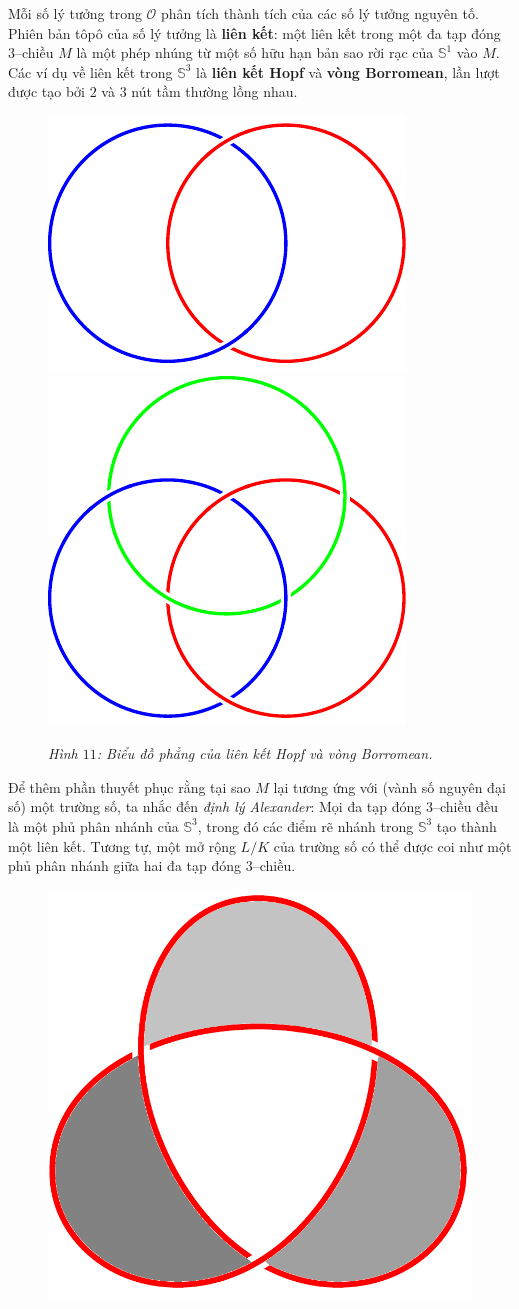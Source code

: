 \begin{multicols}{2}
	\vskip 0.1cm
	Mỗi số lý tưởng trong $\mathcal{O}$ phân tích thành tích của các số lý tưởng nguyên tố. Phiên bản tôpô của số lý tưởng là {\bf\color{duongvaotoanhoc} liên kết}: một liên kết trong một đa tạp đóng $3$--chiều $M$ là một phép nhúng từ một số hữu hạn bản sao rời rạc của $\mathbb{S}^1$ vào $M$. Các ví dụ về liên kết trong $\mathbb{S}^3$ là {\bf\color{duongvaotoanhoc} liên kết Hopf} và {\bf\color{duongvaotoanhoc} vòng Borromean}, lần lượt được tạo bởi $2$ và $3$ nút tầm thường lồng nhau.
	\begin{figure}[H]
		\vspace*{-15pt}
		\centering
		\captionsetup{labelformat= empty, justification=centering}
		\includegraphics[width= 0.42\linewidth]{hopf.pdf}\quad\quad
		\includegraphics[width= 0.42\linewidth]{borromean.pdf}
		\caption{\small\textit{\color{duongvaotoanhoc}Hình $11$: Biểu đồ phẳng của liên kết Hopf và vòng Borromean.}}
		\vspace*{-10pt}
	\end{figure}
	Để thêm phần thuyết phục rằng tại sao $M$ lại tương ứng với (vành số nguyên đại số) một trường số, ta nhắc đến {\it định lý Alexander}: Mọi đa tạp đóng $3$--chiều đều là một phủ phân nhánh của $\mathbb{S}^3$, trong đó các điểm rẽ nhánh trong $\mathbb{S}^3$ tạo thành một liên kết. Tương tự, một mở rộng $L/K$ của trường số có thể được coi như một phủ phân nhánh giữa hai đa tạp đóng $3$--chiều.
	\begin{figure}[H]
		\vspace*{-5pt}
		\centering
		\captionsetup{labelformat= empty, justification=centering}
		\includegraphics[width= 0.42\linewidth]{seifert1}\quad\quad

\end{figure}
\end{multicols}

